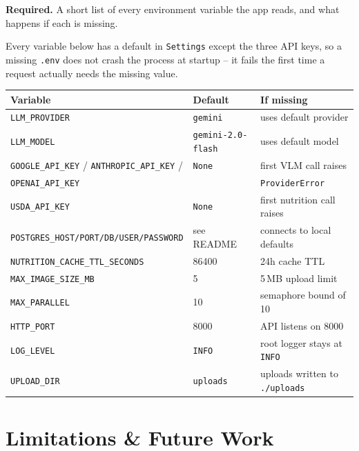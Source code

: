 \documentclass[11pt,a4paper]{article}
\newenvironment{deliverbox}{\begin{deliverboxshown}}{\end{deliverboxshown}}
\newenvironment{deliverbox}{\setbox0\vbox\bgroup}{\egroup\ignorespacesafterend}
\begin{document}
\begin{deliverbox}
\textbf{Required.} A short list of every environment variable the app reads, and what happens if each is missing.
\end{deliverbox}

\par\noindent
Every variable below has a default in \texttt{Settings} except the three
API keys, so a missing \texttt{.env} does not crash the process at startup
-- it fails the first time a request actually needs the missing value.

\begin{center}\small
\begin{tabular}{lll}
\toprule
\textbf{Variable} & \textbf{Default} & \textbf{If missing} \\
\midrule
\texttt{LLM\_PROVIDER} & \texttt{gemini} & uses default provider \\
\texttt{LLM\_MODEL} & \texttt{gemini-2.0-flash} & uses default model \\
\texttt{GOOGLE\_API\_KEY} / \texttt{ANTHROPIC\_API\_KEY} / & \texttt{None} & first VLM call raises \\
\quad\texttt{OPENAI\_API\_KEY} & & \texttt{ProviderError} \\
\texttt{USDA\_API\_KEY} & \texttt{None} & first nutrition call raises \\
\texttt{POSTGRES\_HOST/PORT/DB/USER/PASSWORD} & see README & connects to local defaults \\
\texttt{NUTRITION\_CACHE\_TTL\_SECONDS} & 86400 & 24h cache TTL \\
\texttt{MAX\_IMAGE\_SIZE\_MB} & 5 & 5\,MB upload limit \\
\texttt{MAX\_PARALLEL} & 10 & semaphore bound of 10 \\
\texttt{HTTP\_PORT} & 8000 & API listens on 8000 \\
\texttt{LOG\_LEVEL} & \texttt{INFO} & root logger stays at \texttt{INFO} \\
\texttt{UPLOAD\_DIR} & \texttt{uploads} & uploads written to \texttt{./uploads} \\
\bottomrule
\end{tabular}
\end{center}

\section{Limitations \& Future Work}\label{sec:limits}
\end{document}
